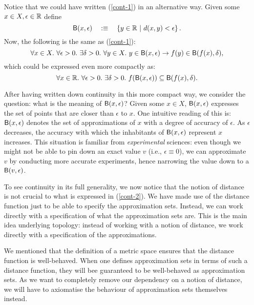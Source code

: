 Notice that we could have written (\ref{cont-1}) in an alternative way. Given
some $x \in X, \epsilon \in \mathbb{R}{}$ define
\begin{equation*}
  \mathsf{B}(x, \epsilon) \quad:\equiv\quad \left\{  y \in \mathbb{R}{} ~|~ d(x, y) < \epsilon  \right\}.
\end{equation*}
Now, the following is the same as (\ref{cont-1}):
\begin{equation*}
  \forall x \in X.~ \forall \epsilon > 0.~ \exists \delta > 0.~ \forall y \in X.~ y \in \mathsf{B}(x, \epsilon) \rightarrow f(y) \in \mathsf{B}(f(x), \delta),
\end{equation*}
which could be expressed even more compactly as:
\begin{equation}\label{cont-2}
  \forall x \in \mathbb{R}{}.~ \forall \epsilon > 0.~ \exists \delta > 0.~ f(\mathsf{B}(x, \epsilon)) \subseteq \mathsf{B}(f(x), \delta).
\end{equation}

After having written down continuity in this more compact way, we consider the question:
what is the meaning of $\mathsf{B}(x, \epsilon)$? Given some $x \in X$, $\mathsf{B}(x, \epsilon)$ expresses the set
of points that are closer than $\epsilon$ to $x$. One intuitive reading of this is: $\mathsf{B}(x, \epsilon)$
denotes the set of approximations of $x$ with a degree of accuracy of $\epsilon$. As $\epsilon$
decreases, the accuracy with which the inhabitants of $\mathsf{B}(x, \epsilon)$ represent $x$
increases. This situation is familiar from \emph{experimental} sciences: even though we
might not be able to pin down an exact value $v$ (i.e., $\epsilon \equiv 0$), we can approximate $v$
by conducting more accurate experiments, hence narrowing the value down to a
$\mathsf{B}(v, \epsilon)$.

To see continuity in its full generality, we now notice that the notion of distance is not
crucial to what is expressed in (\ref{cont-2}). We have made use of the distance function
just to be able to specify the approximation sets. Instead, we can work directly with a
specification of what the approximation sets are. This is the main idea underlying
topology: instead of working with a notion of distance, we work directly with a
specification of the approximations.

We mentioned that the definition of a metric space ensures that the distance function is
well-behaved. When one defines approximation sets in terms of such a distance function,
they will bee guaranteed to be well-behaved as approximation sets. As we want to
completely remove our dependency on a notion of distance, we will have to axiomatise the
behaviour of approximation sets themselves instead.

